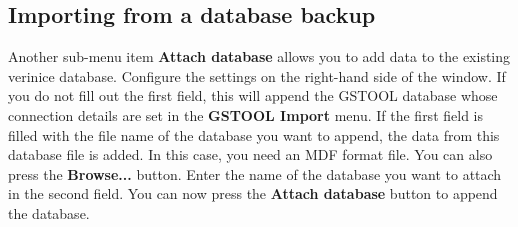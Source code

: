 \documentclass[a4paper,10pt]{book}
\begin{document}
\subsection{Importing from a database backup}
Another sub-menu item \textbf{Attach database} allows you to add data to the existing verinice database. Configure the
settings on the right-hand side of the window. If you do not fill out the first field, this will append the \textsc{GSTOOL}
database whose connection details are set in the \textbf{\textsc{GSTOOL} Import} menu. If the first field is filled with the file name of the
database you want to append, the data from this database file is added. In this case, you need an MDF format file.
You can also press the \textbf{Browse...} button. Enter the name of the database you want to attach in the second field.
You can now press the \textbf{Attach database} button to append the database.
\end{document}
